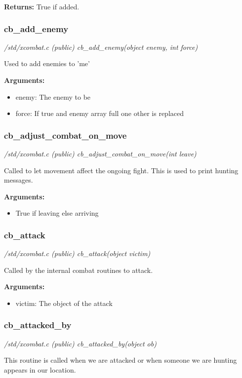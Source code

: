 {\bf Returns:}        True if added.


\subsubsection{cb\_add\_enemy}

{\em /std/xcombat.c (public) cb\_add\_enemy(object enemy, int force)}

Used to add enemies to 'me'

{\bf Arguments:}
\begin{itemize}
\item      enemy: The enemy to be
\item force: If true and enemy array full one other is replaced
\end{itemize}


\subsubsection{cb\_adjust\_combat\_on\_move}

{\em /std/xcombat.c (public) cb\_adjust\_combat\_on\_move(int leave)}

Called to let movement affect the ongoing fight. This
is used to print hunting messages.

{\bf Arguments:}
\begin{itemize}
\item     True if leaving else arriving
\end{itemize}


\subsubsection{cb\_attack}

{\em /std/xcombat.c (public) cb\_attack(object victim)}

Called by the internal combat routines to attack.

{\bf Arguments:}
\begin{itemize}
\item      victim: The object of the attack                
\end{itemize}


\subsubsection{cb\_attacked\_by}

{\em /std/xcombat.c (public) cb\_attacked\_by(object ob)}

This routine is called when we are attacked or when 
someone we are hunting appears in our location.

